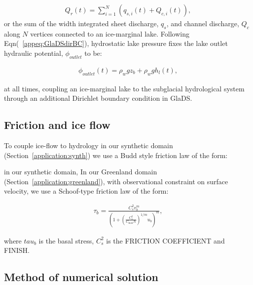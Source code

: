 \documentclass[review,jog]{igs}
\begin{document}
\begin{equation}
\label{eq:sumQr}
\begin{aligned}
Q_{r}(t) = \sum_{i=1}^{N} \left( q_{s,i}(t) + Q_{c,i}(t) \right),
\end{aligned}
\end{equation}
\noindent
or the sum of the width integrated sheet discharge, $q_{s}$, and channel discharge, $Q_{c}$ along $N$ vertices connected to an ice-marginal lake. Following Eqn(~\ref{appeq:GlaDSdirBC}), hydrostatic lake pressure fixes the lake outlet hydraulic potential, $\phi_{outlet}$ to be: 

\begin{equation}
\label{eq:lakephi}
\begin{aligned}
\phi_{outlet} (t) = \rho_{w}gz_{b} + \rho_{w}gh_{l}(t) ,
\end{aligned}
\end{equation}

at all times, coupling an ice-marginal lake to the subglacial hydrological system through an additional Dirichlet boundary condition in GlaDS. 

\subsection{Friction and ice flow}\label{methods:coupling}

To couple ice-flow to hydrology in our synthetic domain (Section~\ref{application:synth}) we use a Budd style friction law of the form:






in our synthetic domain,
In our Greenland domain (Section~\ref{application:greenland}), with observational constraint on surface velocity, we use a Schoof-type friction law \citep{schoof2005effect} of the form: 

\begin{equation}
\label{eq:Schoof}
\begin{aligned}
\tau_b=\frac{C_s^2 v_b^m}{\left(1+\left(\frac{C_s^2}{C_{\max } N}\right)^{1 / m} u_b\right)^m},
\end{aligned}
\end{equation}

where $tau_{b}$ is the basal stress, $C_{s}^{2}$ is the FRICTION COEFFICIENT and FINISH. 



\subsection{Method of numerical solution}\label{methods:Numeric}
\end{document}
